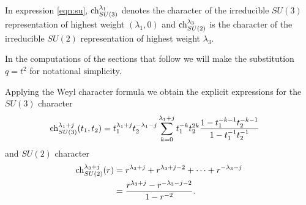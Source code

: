 \documentclass[11pt]{amsart}
\begin{document}
In expression \eqref{eqn:su}, ${\rm ch}_{SU(3)}^{\lambda_1}$ denotes the character of the irreducible $SU(3)$ representation of highest weight $(\lambda_1,0)$ and ${\rm ch}^{\lambda_3}_{SU(2)}$ is the character of the irreducible $SU(2)$ representation of highest weight $\lambda_3$.



In the computations of the sections that follow we will make the substitution $q = t^2$ for notational simplicity.

Applying the Weyl character formula we obtain the explicit expressions for the $SU(3)$ character
\begin{align*}
{\rm ch}_{SU(3)}^{\lambda_1+j} (t_1,t_2) & = t_1^{\lambda_1+j} t_2^{-\lambda_1 -j} \sum_{k=0}^{\lambda_1 + j} t_1^{-k} t_2^{2k} \frac{1 - t_1^{-k-1} t_2^{-k-1}}{1-t_1^{-1} t_2^{-1}} 
\end{align*}
and $SU(2)$ character
\begin{align*}
{\rm ch}_{SU(2)}^{\lambda_3+j} (r) & = r^{\lambda_3+j}+ r^{\lambda_3+j-2} + \cdots + r^{-\lambda_3-j} \\ & = \frac{r^{\lambda_3+j}-r^{-\lambda_3-j-2}}{1-r^{-2}} .
\end{align*}
\end{document}
